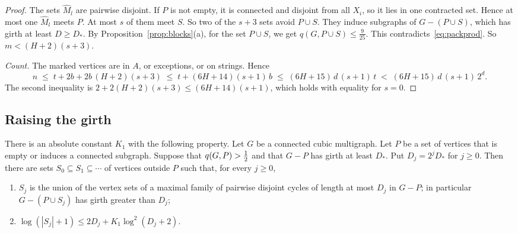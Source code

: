 \begin{proof}
The sets $\widehat M_l$ are pairwise disjoint. If $P$ is not empty, it is connected and disjoint
from all $X_i$, so it lies in one contracted set. Hence at most one $\widehat M_l$ meets $P$. At
most $s$ of them meet $S$. So two of the $s+3$ sets avoid $P\cup S$. They induce subgraphs of
$G-(P\cup S)$, which has girth at least $D\ge D_{*}$. By Proposition~\ref{prop:blocks}(a), for the
set $P\cup S$, we get $q(G,P\cup S)\le\frac9{25}$. This contradicts~\eqref{eq:packprod}. So
$m<(H+2)(s+3)$.

\emph{Count.} The marked vertices are in $A$, or exceptions, or on strings. Hence
\[
  n\;\le\;t+2b+2b\,(H+2)(s+3)\;\le\;t+(6H+14)(s+1)\,b\;\le\;(6H+15)\,d\,(s+1)\,t
  \;<\;(6H+15)\,d\,(s+1)\,2^{d}.
\]
The second inequality is $2+2(H+2)(s+3)\le(6H+14)(s+1)$, which holds with equality for $s=0$.
\end{proof}

\subsection{Raising the girth}

\begin{theorem}\label{thm:raise}
There is an absolute constant $K_1$ with the following property. Let $G$ be a connected cubic
multigraph. Let $P$ be a set of vertices that is empty or induces a connected subgraph. Suppose
that $q(G,P)>\tfrac12$ and that $G-P$ has girth at least $D_{*}$. Put $D_j=2^{j}D_{*}$ for $j\ge0$.
Then there are sets $S_0\subseteq S_1\subseteq\cdots$ of vertices outside $P$ such that, for every
$j\ge0$,
\begin{enumerate}
\item[\textup{(i)}] $S_j$ is the union of the vertex sets of a maximal family of pairwise disjoint
cycles of length at most $D_j$ in $G-P$; in particular $G-(P\cup S_j)$ has girth greater than
$D_j$;
\item[\textup{(ii)}] $\log(|S_j|+1)\le2D_j+K_1\log^{2}(D_j+2)$.
\end{enumerate}
\end{theorem}

